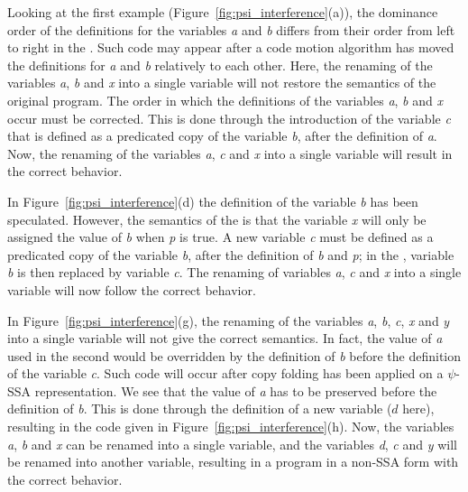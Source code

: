 
Looking at the first example (Figure~\ref{fig:psi_interference}(a)), the dominance order of the definitions
for the variables \textit{a} and \textit{b} differs from their order from
left to right in the \psifun. Such code may appear after a
code motion algorithm has moved the definitions for \textit{a} and
\textit{b} relatively to each other.
%
Here, the renaming of the variables
\textit{a}, \textit{b} and \textit{x} into a single variable will not restore
the semantics of the original program. The order in which the
definitions of the variables \textit{a}, \textit{b} and \textit{x} occur must
be corrected. This is done through the introduction of the variable
\textit{c} that is defined as a predicated copy of the variable \textit{b}, after the definition of \textit{a}. Now, the renaming of
the variables \textit{a}, \textit{c} and \textit{x} into a single variable will
result in the correct behavior.

In Figure~\ref{fig:psi_interference}(d) the definition of the variable
\textit{b} has been speculated. However, the semantics of the \psifun is that the variable \textit{x} will only be assigned the value
of \textit{b} when \textit{p} is {true}. A new variable \textit{c} must be
defined as a predicated copy of the variable \textit{b}, after the definition of \textit{b} and \textit{p}; in the
\psifun, variable \textit{b} is then replaced by variable \textit{c}. 
The renaming of variables \textit{a}, \textit{c} and \textit{x} into a
single variable will now follow the correct behavior.

In Figure~\ref{fig:psi_interference}(g), the renaming of the variables
\textit{a}, \textit{b}, \textit{c}, \textit{x} and \textit{y} into a single variable
will not give the correct semantics. In fact, the value of \textit{a}
used in the second \psifun would be overridden by the
definition of \textit{b} before the definition of the variable
\textit{c}. Such code will occur after copy folding has been applied on a
$\psi$-SSA representation. We see that the value of \textit{a} has to be
preserved before the definition of \textit{b}. This is done through the definition of a new variable ($d$ here), resulting in the code
given in Figure~\ref{fig:psi_interference}(h). Now, the variables \textit{a},
\textit{b} and \textit{x} can be renamed into a single variable, and the
variables \textit{d}, \textit{c} and \textit{y} will be renamed into another
variable, resulting in a program in a non-SSA form with the correct
behavior.

